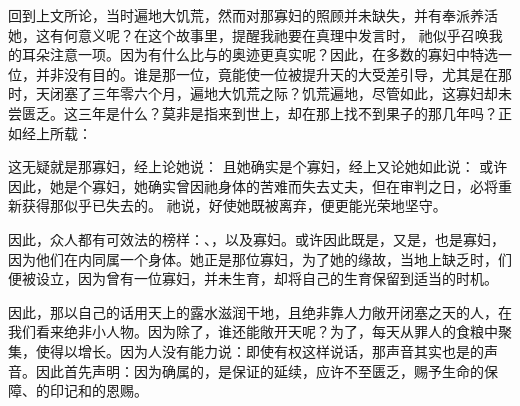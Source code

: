 回到上文所论，当时遍地大饥荒，然而对那寡妇的照顾并未缺失，并有奉派养活她，这有何意义呢？在这个故事里，提醒我祂要在真理中发言时， 祂似乎召唤我的耳朵注意一项。因为有什么比与的奥迹更真实呢？因此，在多数的寡妇中特选一位，并非没有目的。谁是那一位，竟能使一位被提升天的大受差引导，尤其是在那时，天闭塞了三年零六个月，遍地大饥荒之际？饥荒遍地，尽管如此，这寡妇却未尝匮乏。这三年是什么？莫非是指来到世上，却在那上找不到果子的那几年吗？正如经上所载：\par

这无疑就是那寡妇，经上论她说： 且她确实是个寡妇，经上又论她如此说： 或许因此，她是个寡妇，她确实曾因祂身体的苦难而失去丈夫，但在审判之日，必将重新获得那似乎已失去的。 祂说，好使她既被离弃，便更能光荣地坚守。\par

因此，众人都有可效法的榜样：、，以及寡妇。或许因此既是，又是，也是寡妇，因为他们在内同属一个身体。她正是那位寡妇，为了她的缘故，当地上缺乏时，们便被设立，因为曾有一位寡妇，并未生育，却将自己的生育保留到适当的时机。\par

因此，那以自己的话用天上的露水滋润干地，且绝非靠人力敞开闭塞之天的人，在我们看来绝非小人物。因为除了，谁还能敞开天呢？为了，每天从罪人的食粮中聚集，使得以增长。因为人没有能力说：即使有权这样说话，那声音其实也是的声音。因此首先声明：因为确属的，是保证的延续，应许不至匮乏，赐予生命的保障、的印记和的恩赐。\par

